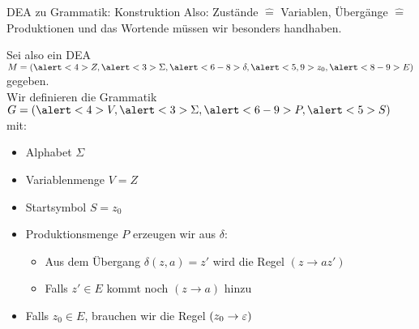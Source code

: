 \begin{frame}{DEA zu Grammatik: Konstruktion}
    Also: \alert<4-5>{Zustände $\hat{=}$ Variablen}, \alert<6-8>{Übergänge $\hat{=}$ Produktionen} und \alert<8-9>{das Wortende} müssen wir besonders handhaben.
    
    Sei also ein \alert<2>{DEA $M = (\alert<4>{Z}, \alert<3>{\Sigma}, \alert<6-8>{\delta}, \alert<5,9>{z_0}, \alert<8-9>{E})$} gegeben. \\
    Wir definieren die \alert<2>{Grammatik $G = (\alert<4>{V}, \alert<3>{\Sigma}, \alert<6-9>{P}, \alert<5>{S})$} mit:
    \begin{itemize}
    	\item<3- | alert@3> Alphabet $\Sigma$
    	\item<4- | alert@4> Variablenmenge $V = Z$
    	\item<5- | alert@5> Startsymbol $S = z_0$
    	\item<6- | alert@6> Produktionsmenge $P$ erzeugen wir aus $\delta$:
    	\begin{itemize}
    		\item<7- | alert@7> Aus dem Übergang $\delta(z, a) = z'$ wird die Regel $(z \to az')$
    		\item<8- | alert@8> Falls $z' \in E$ kommt noch $(z \to a)$ hinzu
    	\end{itemize}
    	\item<9- | alert@9> Falls $z_0 \in E$, brauchen wir die Regel $(z_0 \to \varepsilon)$
    \end{itemize}
\end{frame}

